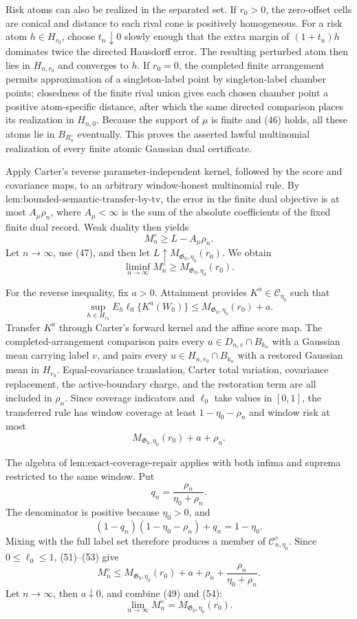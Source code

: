 Risk atoms can also be realized in the separated set.  If \(r_0>0\), the zero-offset cells are conical and distance to each rival cone is positively homogeneous.  For a risk atom \(h\in H_{r_0}\), choose \(t_n\downarrow0\) slowly enough that the extra margin of \((1+t_n)h\) dominates twice the directed Hausdorff error.  The resulting perturbed atom then lies in \(H_{n,r_0}\) and converges to \(h\).  If \(r_0=0\), the completed finite arrangement permits approximation of a singleton-label point by singleton-label chamber points; closedness of the finite rival union gives each chosen chamber point a positive atom-specific distance, after which the same directed comparison places its realization in \(H_{n,0}\).  Because the support of \(\mu\) is finite and (46) holds, all these atoms lie in \(B_{R_n^{\diamond}}\) eventually.  This proves the asserted lawful multinomial realization of every finite atomic Gaussian dual certificate.

Apply Carter's reverse parameter-independent kernel, followed by the score and covariance maps, to an arbitrary window-honest multinomial rule.  By \(\text{lem:bounded-semantic-transfer-by-tv}\), the error in the finite dual objective is at most \(A_\mu\rho_n\), where \(A_\mu<\infty\) is the sum of the absolute coefficients of the fixed finite dual record.  Weak duality then yields
\[
 M_n^{\diamond}\ge L-A_\mu\rho_n.
 \tag{48}
\]
Let \(n\to\infty\), use (47), and then let \(L\uparrow M_{\mathfrak G_0,\eta_0}(r_0)\).  We obtain
\[
 \liminf_{n\to\infty}M_n^{\diamond}
 \ge M_{\mathfrak G_0,\eta_0}(r_0).
 \tag{49}
\]

For the reverse inequality, fix \(a>0\).  Attainment provides \(K^a\in\mathcal C_{\eta_0}\) such that
\[
 \sup_{h\in H_{r_0}}E_h\ell_0\{K^a(W_0)\}
 \le M_{\mathfrak G_0,\eta_0}(r_0)+a.
 \tag{50}
\]
Transfer \(K^a\) through Carter's forward kernel and the affine score map.  The completed-arrangement comparison pairs every \(u\in D_{n,v}\cap B_{k_n}\) with a Gaussian mean carrying label \(v\), and pairs every \(u\in H_{n,r_0}\cap B_{k_n}\) with a restored Gaussian mean in \(H_{r_0}\).  Equal-covariance translation, Carter total variation, covariance replacement, the active-boundary charge, and the restoration term are all included in \(\rho_n\).  Since coverage indicators and \(\ell_0\) take values in \([0,1]\), the transferred rule has window coverage at least \(1-\eta_0-\rho_n\) and window risk at most
\[
 M_{\mathfrak G_0,\eta_0}(r_0)+a+\rho_n.
 \tag{51}
\]

The algebra of \(\text{lem:exact-coverage-repair}\) applies with both infima and suprema restricted to the same window.  Put
\[
 q_n=\frac{\rho_n}{\eta_0+\rho_n}.
 \tag{52}
\]
The denominator is positive because \(\eta_0>0\), and
\[
 (1-q_n)(1-\eta_0-\rho_n)+q_n=1-\eta_0.
 \tag{53}
\]
Mixing with the full label set therefore produces a member of \(\mathcal C_{n,\eta_0}^{\diamond}\).  Since \(0\le\ell_0\le1\), (51)--(53) give
\[
 M_n^{\diamond}
 \le M_{\mathfrak G_0,\eta_0}(r_0)+a+\rho_n
 +\frac{\rho_n}{\eta_0+\rho_n}.
 \tag{54}
\]
Let \(n\to\infty\), then \(a\downarrow0\), and combine (49) and (54):
\[
 \lim_{n\to\infty}M_n^{\diamond}
 =M_{\mathfrak G_0,\eta_0}(r_0).
 \tag{55}
\]

